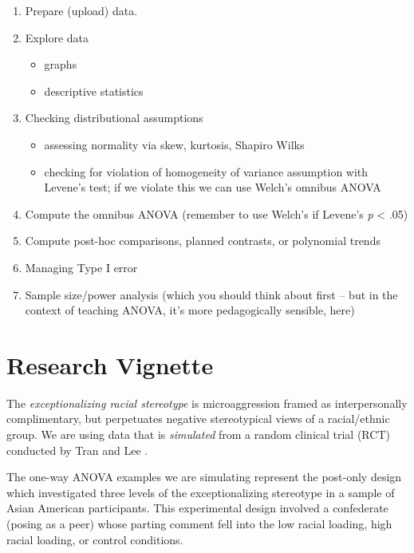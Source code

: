 \documentclass[
  english,
]{book}
\providecommand{\tightlist}{%
  \setlength{\itemsep}{0pt}\setlength{\parskip}{0pt}}
\begin{document}
\begin{enumerate}
\def\labelenumi{\arabic{enumi}.}
\tightlist
\item
  Prepare (upload) data.
\item
  Explore data

  \begin{itemize}
  \tightlist
  \item
    graphs
  \item
    descriptive statistics
  \end{itemize}
\item
  Checking distributional assumptions

  \begin{itemize}
  \tightlist
  \item
    assessing normality via skew, kurtosis, Shapiro Wilks
  \item
    checking for violation of homogeneity of variance assumption with Levene's test; if we violate this we can use Welch's omnibus ANOVA
  \end{itemize}
\item
  Compute the omnibus ANOVA (remember to use Welch's if Levene's \emph{p} \textless{} .05)
\item
  Compute post-hoc comparisons, planned contrasts, or polynomial trends
\item
  Managing Type I error
\item
  Sample size/power analysis (which you should think about first -- but in the context of teaching ANOVA, it's more pedagogically sensible, here)
\end{enumerate}

\hypertarget{research-vignette}{%
\section{Research Vignette}\label{research-vignette}}

The \emph{exceptionalizing racial stereotype} is microaggression framed as interpersonally complimentary, but perpetuates negative stereotypical views of a racial/ethnic group. We are using data that is \emph{simulated} from a random clinical trial (RCT) conducted by Tran and Lee \citeyearpar{tran_you_2014}.

The one-way ANOVA examples we are simulating represent the post-only design which investigated three levels of the exceptionalizing stereotype in a sample of Asian American participants. This experimental design involved a confederate (posing as a peer) whose parting comment fell into the low racial loading, high racial loading, or control conditions.
\end{document}
